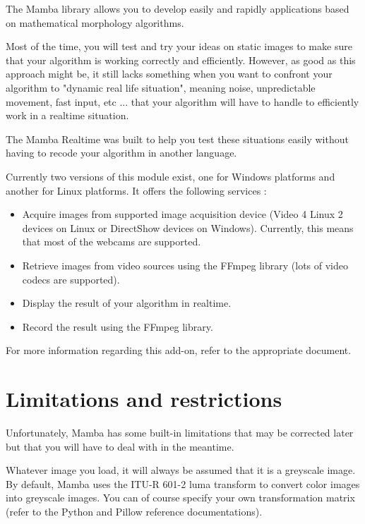 \documentclass[a4paper,10pt,oneside]{article}
\begin{document}
The Mamba library allows you to develop easily and rapidly applications based on 
mathematical morphology algorithms. 

Most of the time, you will test and try your ideas on static images to make sure 
that your algorithm is working correctly and efficiently. However, as good as 
this approach might be, it still lacks something when you want to confront your 
algorithm to "dynamic real life situation", meaning noise, unpredictable 
movement, fast input, etc ... that your algorithm will have to handle to 
efficiently work in a realtime situation.

The Mamba Realtime was built to help you test these situations easily without 
having to recode your algorithm in another language.

Currently two versions of this module exist, one for Windows platforms and 
another for Linux platforms. It offers the following services :

\begin{itemize}
\item Acquire images from supported image acquisition device (Video 4 Linux 2
devices on Linux or DirectShow devices on Windows). Currently, this means that
most of the webcams are 
supported.
\item Retrieve images from video sources using the FFmpeg library (lots of video
codecs are supported).
\item Display the result of your algorithm in realtime.
\item Record the result using the FFmpeg library.
\end{itemize}


For more information regarding this add-on, refer to the appropriate document.

\pagebreak

\section{Limitations and restrictions}
\label{cha:lim_restrict}

Unfortunately, Mamba has some built-in limitations that may be corrected later
but that you will have to deal with in the meantime.

Whatever image you load, it will always be assumed that it is a greyscale image.
By default, Mamba uses the ITU-R 601-2 luma transform to convert color images 
into greyscale images. You can of course specify your own transformation matrix 
(refer to the Python and Pillow reference documentations).
\end{document}
